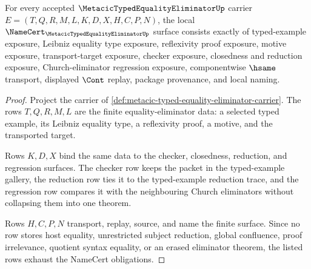 \begin{theorem}
\label{thm:metacic-typed-equality-eliminator-namecert-obligations}
For every accepted $\MetacicTypedEqualityEliminatorUp$ carrier $E=(T,Q,R,M,L,K,D,X,H,C,P,N)$, the local $\NameCert_{\MetacicTypedEqualityEliminatorUp}$ surface consists exactly of typed-example exposure, Leibniz equality type exposure, reflexivity proof exposure, motive exposure, transport-target exposure, checker exposure, closedness and reduction exposure, Church-eliminator regression exposure, componentwise $\hsame$ transport, displayed $\Cont$ replay, package provenance, and local naming.
\end{theorem}
\begin{proof}
Project the carrier of \autoref{def:metacic-typed-equality-eliminator-carrier}. The rows $T,Q,R,M,L$ are the finite equality-eliminator data: a selected typed example, its Leibniz equality type, a reflexivity proof, a motive, and the transported target.

Rows $K,D,X$ bind the same data to the checker, closedness, reduction, and regression surfaces. The checker row keeps the packet in the typed-example gallery, the reduction row ties it to the typed-example reduction trace, and the regression row compares it with the neighbouring Church eliminators without collapsing them into one theorem.

Rows $H,C,P,N$ transport, replay, source, and name the finite surface. Since no row stores host equality, unrestricted subject reduction, global confluence, proof irrelevance, quotient syntax equality, or an erased eliminator theorem, the listed rows exhaust the NameCert obligations.
\end{proof}

